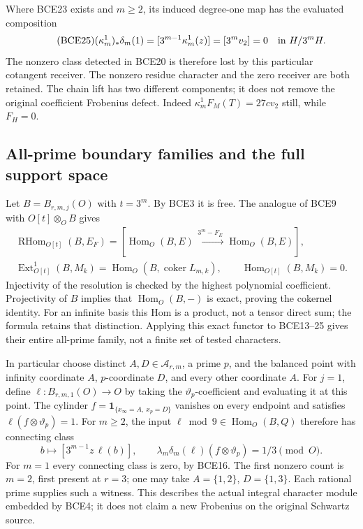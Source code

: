 Where BCE23 exists and \(m\ge2\), its induced degree-one map has
the evaluated composition
\begin{equation}\tag{BCE25}
(\kappa_m^1)_*\delta_m(1)
=[3^{m-1}\kappa_m^1(z)]
=[3^m v_2]=0\quad\hbox{in }H/3^mH .
\end{equation}
The nonzero class detected in BCE20 is therefore lost by this
particular cotangent receiver. The nonzero residue character
and the zero receiver are both retained.
The chain lift has two different components; it does not
remove the original coefficient Frobenius defect. Indeed
\(\kappa_m^1F_M(T)=27cv_2\) still, while \(F_H=0\).

\subsection{All-prime boundary families and the full support space}

Let \(B=B_{r,m,j}(O)\) with \(t=3^m\). By BCE3 it is free.
The analogue of BCE9 with \(O[t]\otimes_OB\) gives
\begin{equation}\tag{BCE26}
\begin{gathered}
\operatorname{RHom}_{O[t]}(B,E_F)
=\left[\operatorname{Hom}_O(B,E)
       \xrightarrow{\,3^m-F_E\,}\operatorname{Hom}_O(B,E)\right],\\
\operatorname{Ext}^1_{O[t]}(B,M_k)
 =\operatorname{Hom}_O(B,\operatorname{coker}L_{m,k}),\qquad
\operatorname{Hom}_{O[t]}(B,M_k)=0 .
\end{gathered}
\end{equation}
Injectivity of the resolution is checked by the highest polynomial
coefficient. Projectivity of \(B\) implies that
\(\operatorname{Hom}_O(B,-)\) is exact, proving the cokernel
identity. For an infinite basis this Hom is a product, not a
tensor direct sum; the formula retains that distinction.
Applying this exact functor to BCE13--25 gives their entire
all-prime family, not a finite set of tested characters.

In particular choose distinct \(A,D\in\mathcal A_{r,m}\), a prime
\(p\), and the balanced point with infinity coordinate \(A\),
\(p\)-coordinate \(D\), and every other coordinate \(A\).
For \(j=1\), define \(\ell:B_{r,m,1}(O)\to O\) by taking the
\(\vartheta_p\)-coefficient and evaluating it at this point.
The cylinder \(f=\mathbf1_{\{x_\infty=A,\ x_p=D\}}\) vanishes on
every endpoint and satisfies \(\ell(f\otimes\vartheta_p)=1\).
For \(m\ge2\), the input \(\ell\bmod9\in\operatorname{Hom}_O(B,Q)\)
therefore has connecting class
\begin{equation}\tag{BCE27}
b\longmapsto[3^{m-1}z\,\ell(b)],\qquad
\lambda_m\delta_m(\ell)(f\otimes\vartheta_p)=1/3\pmod O .
\end{equation}
For \(m=1\) every connecting class is zero, by BCE16.
The first nonzero count is \(m=2\), first present at \(r=3\);
one may take \(A=\{1,2\}\), \(D=\{1,3\}\).
Each rational prime supplies such a witness. This describes
the actual integral character module embedded by BCE4; it
does not claim a new Frobenius on the original Schwartz source.

